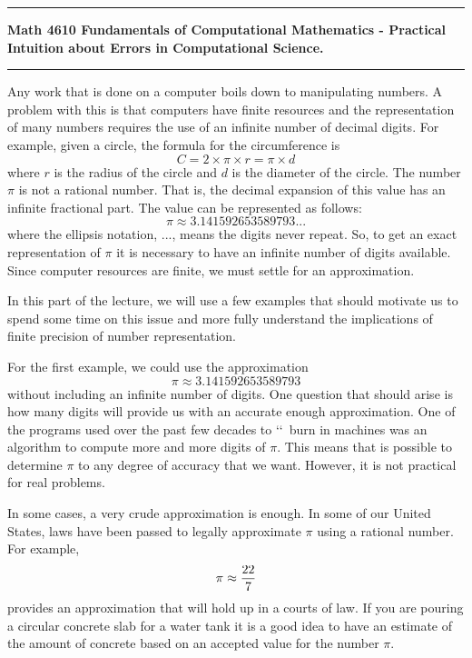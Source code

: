 \documentclass[10pt,fleqn]{article}
\begin{document}
\vskip0.1in\hrule\vskip0.1in
\noindent
{\bf Math 4610 Fundamentals of Computational Mathematics  -  Practical Intuition
    about Errors in Computational Science.}  
\vskip0.1in\hrule\vskip0.1in
\noindent
Any work that is done on a computer boils down to manipulating numbers. A
problem with this is that computers have finite resources and the representation
of many numbers requires the use of an infinite number of decimal digits. For
example, given a circle, the formula for the circumference is
$$C = 2 \times \pi \times r = \pi \times d$$
where $r$ is the radius of the circle and $d$ is the diameter of the circle. The
number $\pi$ is not a rational number. That is, the decimal expansion of this
value has an infinite fractional part. The value can be represented as follows:
$$\pi\approx 3.141592653589793...$$
where the ellipsis notation, $...$, means the digits never repeat. So, to get an
exact representation of $\pi$ it is necessary to have an infinite number of
digits available. Since computer resources are finite, we must settle for an
approximation.

In this part of the lecture, we will use a few examples that should motivate us
to spend some time on this issue and more fully understand the implications of
finite precision of number representation.

For the first example, we could use the approximation
$$\pi\approx 3.141592653589793$$
without including an infinite number of digits. One question that should arise
is how many digits will provide us with an accurate enough approximation. One
of the programs used over the past few decades to \lq\lq\ burn in machines was
an algorithm to compute more and more digits of $\pi$. This means that is
possible to determine $\pi$ to any degree of accuracy that we want. However, it
is not practical for real problems.

In some cases, a very crude approximation is enough. In some of our United
States, laws have been passed to legally approximate $\pi$ using a rational
number. For example,
$$\pi\approx {{22}\over 7}$$
provides an approximation that will hold up in a courts of law. If you are
pouring a circular concrete slab for a water tank it is a good idea to have an
estimate of the amount of concrete based on an accepted value for the number
$\pi$.
\end{document}
